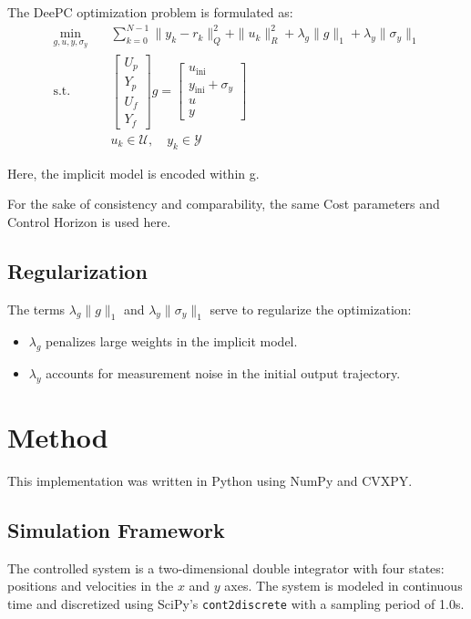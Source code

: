 \documentclass[11pt,a4paper]{article}
\begin{document}
The DeePC optimization problem is formulated as:
\[
\begin{aligned}
\min_{g, u, y, \sigma_y} &\quad \sum_{k=0}^{N-1} \|y_k - r_k\|_Q^2 + \|u_k\|_R^2 + \lambda_g \|g\|_1 + \lambda_y \|\sigma_y\|_1 \\
\text{s.t.} &\quad \begin{bmatrix} U_p \\ Y_p \\ U_f \\ Y_f \end{bmatrix} g = \begin{bmatrix} u_{\text{ini}} \\ y_{\text{ini}} + \sigma_y \\ u \\ y \end{bmatrix} \\
&\quad u_k \in \mathcal{U}, \quad y_k \in \mathcal{Y}
\end{aligned}
\]

Here, the implicit model is encoded within g.

For the sake of consistency and comparability, the same Cost parameters and Control Horizon is used here.

\subsection{Regularization}
The terms \( \lambda_g \|g\|_1 \) and \( \lambda_y \|\sigma_y\|_1 \) serve to regularize the optimization:
\begin{itemize}
    \item \( \lambda_g \) penalizes large weights in the implicit model.
    \item \( \lambda_y \) accounts for measurement noise in the initial output trajectory.
\end{itemize}

\section{Method}
This implementation was written in Python using NumPy and CVXPY.

\subsection{Simulation Framework}
The controlled system is a two-dimensional double integrator with four states: positions and velocities in the \(x\) and \(y\) axes. The system is modeled in continuous time and discretized using SciPy’s \texttt{cont2discrete} with a sampling period of 1.0s.
\end{document}
